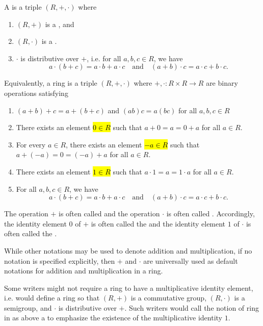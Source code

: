 \begin{definition}\label{definition:ring}
    A  is a triple $(R, +, \cdot)$ where 
    \begin{enumerate}
        \item $(R,+)$ is a , and
        \item $(R, \cdot)$ is a . 
        \item $\cdot$ is distributive over $+$, i.e. for all $a,b,c \in R$, we have
        $$a \cdot (b+c) = a \cdot b + a \cdot c \quad \text{and} \quad (a+b) \cdot c = a \cdot c + b \cdot c.$$
    \end{enumerate}

    Equivalently, a ring is a triple $(R,+,\cdot)$ where $+,\cdot: R \times R \to R$ are binary operations satisfying
    \begin{enumerate}
        \item $(a+b)+c = a+(b+c)$ and $(ab)c = a(bc)$ for all $a,b,c \in R$
        \item There exists an element \hl{$0 \in R$} such that $a+0 = a = 0 + a$ for all $a \in R$.
        \item For every $a \in R$, there exists an element \hl{$-a \in R$} such that $a+(-a) = 0 = (-a) + a$ for all $a \in R$.
        \item There exists an element \hl{$1 \in R$} such that $a \cdot 1 = a = 1 \cdot a$ for all $a \in R$.
        \item For all $a,b,c \in R$, we have
        $$a \cdot (b+c) = a \cdot b + a \cdot c \quad \text{and} \quad (a+b) \cdot c = a \cdot c + b \cdot c.$$
    \end{enumerate} 

    The operation $+$ is often called  and the operation $\cdot$ is often called . Accordingly, the identity element $0$ of $+$ is often called the  and the identity element $1$ of $\cdot$ is often called the .

    While other notations may be used to denote addition and multiplication, if no notation is specified explicitly, then $+$ and $\cdot$ are universally used as default notations for addition and multiplication in a ring.

    Some writers might not require a ring to have a multiplicative identity element, i.e. would define a ring so that $(R,+)$ is a commutative group, $(R, \cdot)$ is a semigroup, and $\cdot$ is distributive over $+$. Such writers would call the notion of ring in as above a  to emphasize the existence of the multiplicative identity $1$. 
\end{definition}
